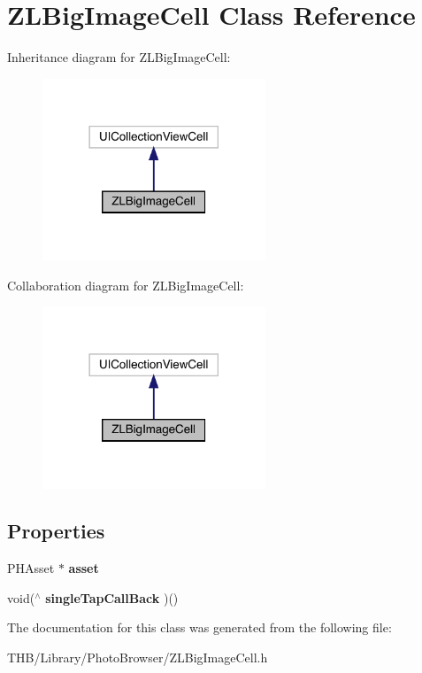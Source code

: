 \hypertarget{interface_z_l_big_image_cell}{}\section{Z\+L\+Big\+Image\+Cell Class Reference}
\label{interface_z_l_big_image_cell}


Inheritance diagram for Z\+L\+Big\+Image\+Cell\+:\nopagebreak
\begin{figure}[H]
\begin{center}
\leavevmode
\includegraphics[width=189pt]{interface_z_l_big_image_cell__inherit__graph}
\end{center}
\end{figure}


Collaboration diagram for Z\+L\+Big\+Image\+Cell\+:\nopagebreak
\begin{figure}[H]
\begin{center}
\leavevmode
\includegraphics[width=189pt]{interface_z_l_big_image_cell__coll__graph}
\end{center}
\end{figure}
\subsection*{Properties}
\begin{DoxyCompactItemize}
\item 
\mbox{\label{interface_z_l_big_image_cell_a0230d2dcf3e18db951ccfe1436696e02}} 
P\+H\+Asset $\ast$ {\bfseries asset}
\item 
\mbox{\label{interface_z_l_big_image_cell_a3b474c9ecef2e6ef136ece4429c4f3b8}} 
void($^\wedge$ {\bfseries single\+Tap\+Call\+Back} )()
\end{DoxyCompactItemize}


The documentation for this class was generated from the following file\+:\begin{DoxyCompactItemize}
\item 
T\+H\+B/\+Library/\+Photo\+Browser/Z\+L\+Big\+Image\+Cell.\+h\end{DoxyCompactItemize}
